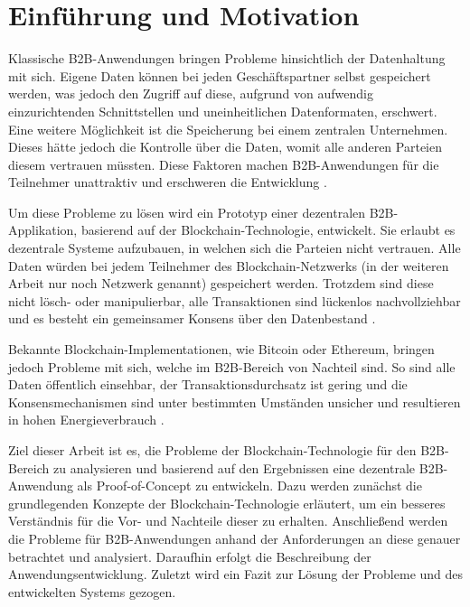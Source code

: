 \chapter{Einführung und Motivation}
\label{cha:einfuehrung}

Klassische B2B-Anwendungen bringen Probleme hinsichtlich der Datenhaltung mit sich. Eigene Daten können bei jeden Geschäftspartner selbst gespeichert werden, was jedoch den Zugriff auf diese, aufgrund von aufwendig einzurichtenden Schnittstellen und uneinheitlichen Datenformaten, erschwert. Eine weitere Möglichkeit ist die Speicherung bei einem zentralen Unternehmen. Dieses hätte jedoch die Kontrolle über die Daten, womit alle anderen Parteien diesem vertrauen müssten. Diese Faktoren machen B2B-Anwendungen für die Teilnehmer unattraktiv und erschweren die Entwicklung \cite{KorpelaDigitalSupplyChain2017}\cite{WustyouneedBlockchain2017}.

Um diese Probleme zu lösen wird ein Prototyp einer dezentralen B2B-Applikation, basierend auf der Blockchain-Technologie, entwickelt. Sie erlaubt es dezentrale Systeme aufzubauen, in welchen sich die Parteien nicht vertrauen. Alle Daten würden bei jedem Teilnehmer des Blockchain-Netzwerks (in der weiteren Arbeit nur noch Netzwerk genannt) gespeichert werden. Trotzdem sind diese nicht lösch- oder manipulierbar, alle Transaktionen sind lückenlos nachvollziehbar und es besteht ein gemeinsamer Konsens über den Datenbestand \cite{CrosbyBlockChainTechnologyBitcoin2016}.

Bekannte Blockchain-Implementationen, wie Bitcoin oder Ethereum, bringen jedoch Probleme mit sich, welche im B2B-Bereich von Nachteil sind. So sind alle Daten öffentlich einsehbar, der Transaktionsdurchsatz ist gering und die Konsensmechanismen sind unter bestimmten Umständen unsicher und resultieren in hohen Energieverbrauch \cite{Gramolidangerprivateblockchains2016}\cite{NakamotoBitcoinPeertoPeerElectronic2008}\cite{EthereumTeamEthereumWhitePaper2017}. 

Ziel dieser Arbeit ist es, die Probleme der Blockchain-Technologie für den B2B-Bereich zu analysieren und basierend auf den Ergebnissen eine dezentrale B2B-Anwendung als Proof-of-Concept zu entwickeln. Dazu werden zunächst die grundlegenden Konzepte der Blockchain-Technologie erläutert, um ein besseres Verständnis für die Vor- und Nachteile dieser zu erhalten. Anschließend werden die Probleme für B2B-Anwendungen anhand der Anforderungen an diese genauer betrachtet und analysiert. Daraufhin erfolgt die Beschreibung der Anwendungsentwicklung. Zuletzt wird ein Fazit zur Lösung der Probleme und des entwickelten Systems gezogen.
